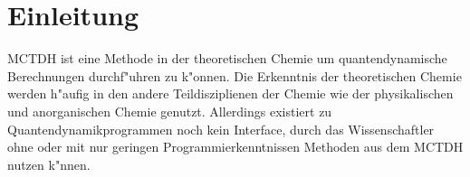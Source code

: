 \chapter{Einleitung}

MCTDH ist eine Methode in der theoretischen Chemie um quantendynamische Berechnungen durchf"uhren zu k"onnen.
Die Erkenntnis der theoretischen Chemie werden h"aufig in den andere Teildisziplienen der Chemie wie der physikalischen und anorganischen Chemie genutzt.
Allerdings existiert zu Quantendynamikprogrammen noch kein Interface, durch das Wissenschaftler ohne oder mit nur geringen Programmierkenntnissen Methoden aus dem MCTDH nutzen k"nnen.      

